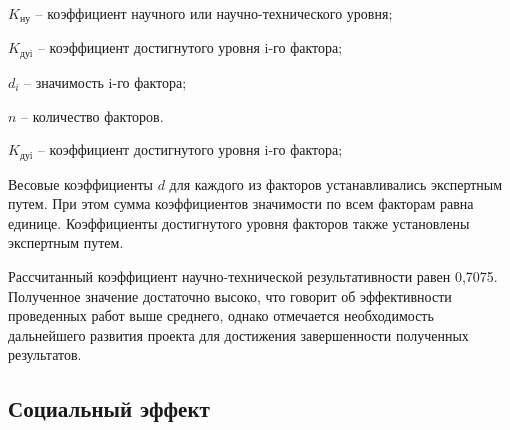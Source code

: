 $K_\text{ну}$ – коэффициент научного или научно-технического уровня;

$K_\text{дуi}$ – коэффициент достигнутого уровня i-го фактора;

$d_i$ – значимость i-го фактора;

$n$ – количество факторов.

$K_\text{дуi}$ – коэффициент достигнутого уровня $\text{i}$-го фактора;

Весовые коэффициенты $d$ для каждого из факторов устанавливались экспертным путем. При этом сумма коэффициентов значимости по всем факторам равна единице. Коэффициенты достигнутого уровня факторов также установлены экспертным путем.

Рассчитанный коэффициент научно-технической результативности равен 0,7075. Полученное значение достаточно высоко, что говорит об эффективности проведенных работ выше среднего, однако отмечается необходимость дальнейшего развития проекта для достижения завершенности полученных результатов.

\subsection{Социальный эффект}
